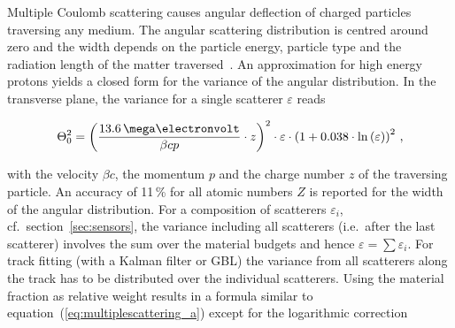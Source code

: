 % 
%
%
%
%
%
Multiple Coulomb scattering causes angular deflection of charged particles traversing any medium.
The angular scattering distribution is centred around zero
 and the width depends on the particle energy, particle type and the radiation length of the matter traversed~\cite{ref:scatteringhighland}.
An approximation for high energy protons yields a closed form for the variance of the angular distribution. 
In the transverse plane, the variance for a single scatterer $\varepsilon$ reads~\cite{ref:PDG-2014}

\begin{equation}
\label{eq:multiplescattering_a}
\Theta_{0}^{2} = \left( \frac{13.6\,\mega\electronvolt}{\beta c p} \cdot z \right)^2
\cdot \varepsilon
\cdot \left( 1 + 0.038 \cdot \ln{\left( \varepsilon \right) } \right)^2 \,,
\end{equation}

\noindent with the velocity $\beta c$, the momentum $p$ and the charge number $z$ of the traversing particle. 
An accuracy of 11\,\% for all atomic numbers $Z$ is reported for the width of the angular distribution. 
For a composition of scatterers $\varepsilon_i$, cf.\ section~\ref{sec:sensors}, the variance including all scatterers (i.e.\ after the last scatterer)
 involves the sum over the material budgets and hence $\varepsilon = \sum \varepsilon_i$. 
For track fitting (with a Kalman filter or GBL) the variance from all scatterers along the track has to be distributed over the individual scatterers. 
Using the material fraction as relative weight results in a formula similar to equation~(\ref{eq:multiplescattering_a}) except for the logarithmic correction

